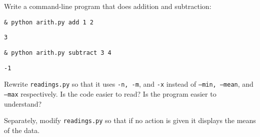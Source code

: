 \documentclass{beamer}
\begin{document}
\begin{frame}{ }
Write a command-line program that does addition and subtraction:
\vspace{0.5cm}

\begin{beamerboxesrounded}[upper=uppercolgreen,lower=lowercolgreen,shadow=false]{}
\texttt{\& python arith.py add 1 2 }
\end{beamerboxesrounded}

\begin{beamerboxesrounded}[upper=uppercolgreen,lower=lowercolgreen,shadow=false]{}
\texttt{3}
\end{beamerboxesrounded}

\begin{beamerboxesrounded}[upper=uppercolgreen,lower=lowercolgreen,shadow=false]{}
\texttt{\& python arith.py subtract 3 4 }
\end{beamerboxesrounded}

\begin{beamerboxesrounded}[upper=uppercolgreen,lower=lowercolgreen,shadow=false]{}
\texttt{-1}
\end{beamerboxesrounded}


\end{frame}

\begin{frame}{ }
Rewrite \texttt{readings.py} so that it uses \texttt{-n, -m}, and \texttt{-x} instead of \texttt{--min, --mean}, and \texttt{--max} respectively. Is the code easier to read? Is the program easier to understand?

\end{frame}


\begin{frame}{ }
Separately, modify \texttt{readings.py} so that if no action is given it displays the means of the data.
\end{frame}

\end{document}

